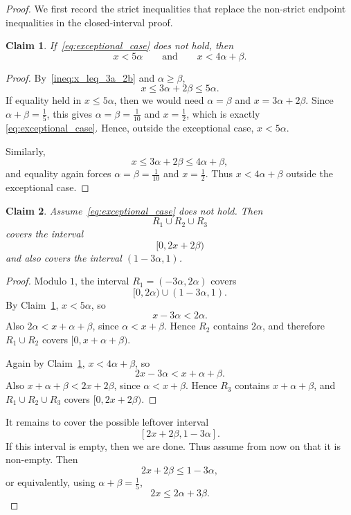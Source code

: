 \documentclass{article}
\newtheorem{claim}{Claim}
\begin{document}
\begin{proof}
We first record the strict inequalities that replace the non-strict endpoint inequalities
in the closed-interval proof.

\begin{claim}\label{claim:strict_first_inequalities}
If~\eqref{eq:exceptional_case} does not hold, then
\[
    x<5\alpha
    \qquad\text{and}\qquad
    x<4\alpha+\beta.
\]
\end{claim}

\begin{proof}
By~\eqref{ineq:x_leq_3a_2b} and $\alpha\geq\beta$,
\[
    x\leq 3\alpha+2\beta\leq 5\alpha.
\]
If equality held in $x\leq 5\alpha$, then we would need $\alpha=\beta$ and
$x=3\alpha+2\beta$. Since $\alpha+\beta=\frac15$, this gives
$\alpha=\beta=\frac1{10}$ and $x=\frac12$, which is exactly
\eqref{eq:exceptional_case}. Hence, outside the exceptional case, $x<5\alpha$.

Similarly,
\[
    x\leq 3\alpha+2\beta\leq 4\alpha+\beta,
\]
and equality again forces $\alpha=\beta=\frac1{10}$ and $x=\frac12$. Thus
$x<4\alpha+\beta$ outside the exceptional case.
\end{proof}

\begin{claim}\label{claim:first_cover}
Assume~\eqref{eq:exceptional_case} does not hold. Then
\[
    R_1\cup R_2\cup R_3
\]
covers the interval
\[
    [0,2x+2\beta)
\]
and also covers the interval $(1-3\alpha,1)$.
\end{claim}

\begin{proof}
Modulo $1$, the interval $R_1=(-3\alpha,2\alpha)$ covers
\[
    [0,2\alpha)\cup(1-3\alpha,1).
\]
By Claim~\ref{claim:strict_first_inequalities}, $x<5\alpha$, so
\[
    x-3\alpha<2\alpha.
\]
Also $2\alpha<x+\alpha+\beta$, since $\alpha<x+\beta$. Hence $R_2$ contains
$2\alpha$, and therefore $R_1\cup R_2$ covers $[0,x+\alpha+\beta)$.

Again by Claim~\ref{claim:strict_first_inequalities}, $x<4\alpha+\beta$, so
\[
    2x-3\alpha<x+\alpha+\beta.
\]
Also $x+\alpha+\beta<2x+2\beta$, since $\alpha<x+\beta$. Hence $R_3$ contains
$x+\alpha+\beta$, and $R_1\cup R_2\cup R_3$ covers $[0,2x+2\beta)$.
\end{proof}

It remains to cover the possible leftover interval
\begin{equation}\label{eq:leftover}
    [2x+2\beta,1-3\alpha].
\end{equation}
If this interval is empty, then we are done. Thus assume from now on that it is non-empty.
Then
\begin{equation}\label{ineq:leftover_nonempty}
    2x+2\beta\leq 1-3\alpha,
\end{equation}
or equivalently, using $\alpha+\beta=\frac15$,
\begin{equation}\label{ineq:two_x_bound}
    2x\leq 2\alpha+3\beta.
\end{equation}


\end{proof}
\end{document}
